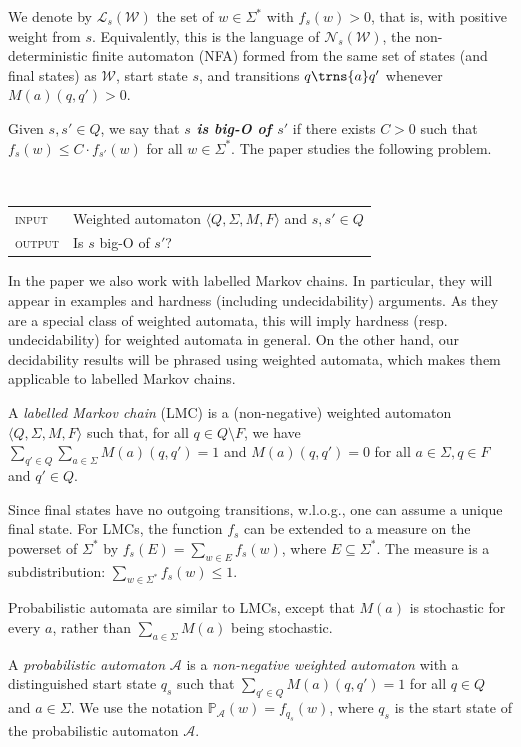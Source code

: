 \documentclass{lmcs}
\theoremstyle{plain}
\theoremstyle{definition}
\theoremstyle{remark}
\newcommand\abra[1]{\langle #1 \rangle}
\newcommand\lng[2]{\mathcal{L}_{#1}(#2)}
\newcommand\pr{\mathbb{P}}
\newcommand\nfa{\mathcal{N}}
\newcommand\wa{\mathcal{W}}
\newcommand\nfaof[2]{\nfa_{#2}(#1)}
\renewcommand\nu{f}
\begin{document}
 \begin{defi}\label{def:nfaof} We denote by $\lng{s}{\wa}$  the set of $w\in \Sigma^\ast$
with $\nu_s(w) > 0 $, that is, with positive weight from $s$. Equivalently, this is the language of $\nfaof{\wa}{s}$, the non-deterministic finite automaton (NFA) formed from the same set of states (and final states) as $\wa$, start state $s$, and transitions $q\trns{a} q'$ whenever $M(a)(q,q') > 0$. \end{defi}

Given $s,s'\in Q$, we say that \textbf{\emph{$s$ is big-O of $s'$}} if there exists $C > 0 $ such that
$\nu_s(w) \le C \cdot \nu_{s'}(w)$  for all $w\in \Sigma^*$.
The paper studies  the following problem.


\begin{defi}\mbox{}\\
\begin{tabular}{ll}
\textsc{input} & Weighted automaton $\abra{Q, \Sigma{}, M, F}$ and $s,s'\in Q$\\
\textsc{output} & Is $s$ big-O of $s'$?
\end{tabular}
\end{defi}

\noindent In the paper we also work with labelled Markov chains. In particular, they will appear in examples and hardness (including undecidability) arguments.
As they are a special class of weighted automata, this will imply hardness (resp. undecidability) for weighted automata in general.
On the other hand, our decidability results will be phrased using weighted automata, which makes them applicable  to labelled Markov chains.
\begin{defi}
A \emph{labelled Markov chain} (LMC) is a (non-negative) weighted automaton  $\abra{Q, \Sigma{}, M, F}$ such that, for all $q\in Q\setminus F$,
we have $\sum_{q'\in Q}\sum_{a\in \Sigma{}} M(a)(q,q') = 1$  and   $M(a)(q,q') = 0$ for all  $a\in\Sigma{}, q\in F$ and $q' \in Q$.
\end{defi}
Since final states have no outgoing transitions, w.l.o.g., one can assume a unique final state.
For LMCs, the function $\nu_s$ can be extended to a measure on  the powerset of $\Sigma^\ast$ by
$\nu_s(E) = \sum_{ w\in E} \nu_s(w)$, where $E\subseteq \Sigma^*$. The measure is a subdistribution: $\sum_{w\in\Sigma^*} \nu_s(w) \le 1$.

Probabilistic automata are similar to LMCs, except that $M(a)$ is stochastic for every $a$, rather than
$\sum_{a\in \Sigma} M(a) $ being stochastic. \begin{defi}\label{defi:probautomata}
  A \textit{probabilistic automaton} $\mathcal{A}$ is a
\textit{non-negative weighted automaton} with a distinguished start state $q_s$ such that
$\sum_{q'\in Q} M(a)(q,q') = 1$ for all $q\in Q$ and $a \in \Sigma$. We use the notation $\pr_\mathcal{A}(w) = \nu_{q_s}(w)$, where $q_s$ is the start state of the probabilistic automaton $\mathcal{A}$.
\end{defi}
\end{document}
